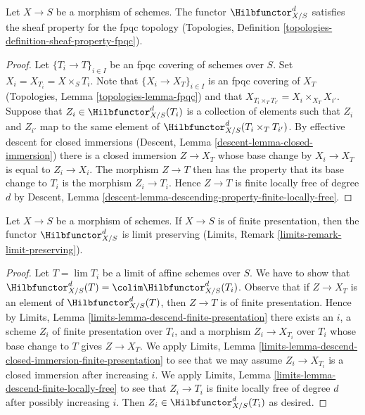 \begin{lemma}
\label{lemma-hilb-d-sheaf}
Let $X \to S$ be a morphism of schemes. The functor $\Hilbfunctor^d_{X/S}$
satisfies the sheaf property for the fpqc topology
(Topologies, Definition \ref{topologies-definition-sheaf-property-fpqc}).
\end{lemma}

\begin{proof}
Let $\{T_i \to T\}_{i \in I}$ be an fpqc covering of schemes over $S$.
Set $X_i = X_{T_i} = X \times_S T_i$.
Note that $\{X_i \to X_T\}_{i \in I}$ is an fpqc covering of
$X_T$ (Topologies, Lemma \ref{topologies-lemma-fpqc})
and that $X_{T_i \times_T T_{i'}} = X_i \times_{X_T} X_{i'}$.
Suppose that $Z_i \in \Hilbfunctor^d_{X/S}(T_i)$ is a collection of
elements such that $Z_i$ and $Z_{i'}$ map to the same element of
$\Hilbfunctor^d_{X/S}(T_i \times_T T_{i'})$. By effective descent
for closed immersions (Descent, Lemma \ref{descent-lemma-closed-immersion})
there is a closed immersion $Z \to X_T$ whose base change by
$X_i \to X_T$ is equal to $Z_i \to X_i$. The morphism $Z \to T$
then has the property that its base change to $T_i$ is the morphism
$Z_i \to T_i$. Hence $Z \to T$ is finite locally free of degree $d$
by Descent, Lemma \ref{descent-lemma-descending-property-finite-locally-free}.
\end{proof}

\begin{lemma}
\label{lemma-hilb-d-limit-preserving}
Let $X \to S$ be a morphism of schemes. If $X \to S$ is
of finite presentation, then the functor $\Hilbfunctor^d_{X/S}$
is limit preserving (Limits, Remark \ref{limits-remark-limit-preserving}).
\end{lemma}

\begin{proof}
Let $T = \lim T_i$ be a limit of affine schemes over $S$. We have to show
that $\Hilbfunctor^d_{X/S}(T) = \colim \Hilbfunctor^d_{X/S}(T_i)$.
Observe that if $Z \to X_T$ is an element of $\Hilbfunctor^d_{X/S}(T)$,
then $Z \to T$ is of finite presentation. Hence by
Limits, Lemma \ref{limits-lemma-descend-finite-presentation}
there exists an $i$, a scheme $Z_i$ of finite presentation over $T_i$,
and a morphism $Z_i \to X_{T_i}$ over $T_i$ whose base change to $T$
gives $Z \to X_T$. We apply Limits, Lemma
\ref{limits-lemma-descend-closed-immersion-finite-presentation}
to see that we may assume $Z_i \to X_{T_i}$ is a closed immersion
after increasing $i$.
We apply Limits, Lemma \ref{limits-lemma-descend-finite-locally-free}
to see that $Z_i \to T_i$ is finite locally free of degree $d$
after possibly increasing $i$.
Then $Z_i \in \Hilbfunctor^d_{X/S}(T_i)$ as desired.
\end{proof}

